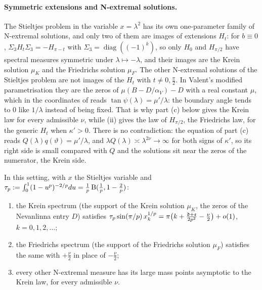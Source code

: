 \paragraph{Symmetric extensions and N-extremal solutions.} The Stieltjes problem in the variable
$x=\lambda^2$ has its own one-parameter family of N-extremal solutions, and only two of them are images
of extensions $H_t$: for $b\equiv0$, $\Sigma_3H_t\Sigma_3=-H_{\pi-t}$ with $\Sigma_3=\operatorname{diag}((-1)^k)$,
so only $H_0$ and $H_{\pi/2}$ have spectral measures symmetric under $\lambda\mapsto-\lambda$, and their
images are the Krein solution $\mu_K$ and the Friedrichs solution $\mu_F$. The other N-extremal
solutions of the Stieltjes problem are not images of the $H_t$ with $t\ne0,\frac\pi2$. In Valent's
modified parametrisation \cite[eq.~(54)]{Valent2006} they are the zeros of $\mu(B-D/\alpha_V)-D$ with a
real constant $\mu$, which in the coordinates of  reads $\tan\psi(\lambda)=\mu'/\lambda$: the
boundary angle tends to $0$ like $1/\lambda$ instead of being fixed. That is why part (c) below gives
the Krein law for every admissible $\nu$, while (ii) gives the law of $H_{\pi/2}$, the
Friedrichs law, for the generic $H_t$ when $\kappa'>0$. There is no contradiction: the equation of part
(c) reads $Q(\lambda)q(\vartheta)=\mu'/\lambda$, and $\lambda Q(\lambda)\asymp\lambda^{2\nu}\to\infty$ for both signs
of $\kappa'$, so its right side is small compared with $Q$ and the solutions sit near the zeros of the
numerator, the Krein side.

\begin{corollary}\label{cor:bd}
In this setting, with $x$ the Stieltjes variable and
$\tau_p:=\int_0^1(1-u^p)^{-2/p}du=\frac1p\operatorname{B}(\frac1p,1-\frac2p)$:
\begin{enumerate}
\item[(a)] the Krein spectrum (the support of the Krein solution $\mu_K$, the zeros of
  the Nevanlinna entry $D$) satisfies
  $\tau_p\sin(\pi/p)\,x_k^{1/p}=\pi\bigl(k+\frac{\mathfrak d+\mathfrak e}{2p^2}-\frac\nu2\bigr)+o(1)$, $k=0,1,2,\dots$;
\item[(b)] the Friedrichs spectrum (the support of the Friedrichs solution $\mu_F$) satisfies the same with
  $+\frac\nu2$ in place of $-\frac\nu2$;
\item[(c)] every other N-extremal measure has its large mass points asymptotic to the
  Krein law, for every admissible $\nu$.
\end{enumerate}
\end{corollary}

